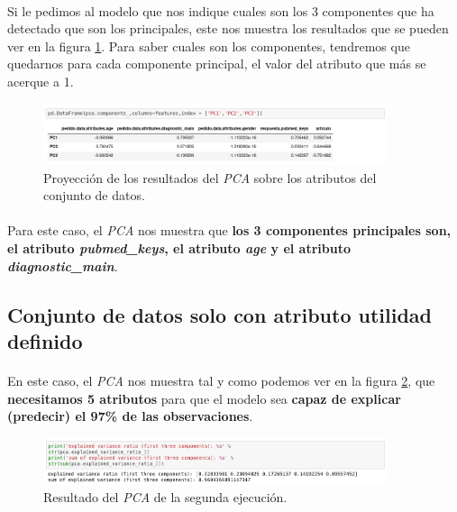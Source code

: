 \paragraph{}
Si le pedimos al modelo que nos indique cuales son los 3 componentes que ha detectado que son los principales, este nos muestra los resultados que se pueden ver en la figura \ref{pcaOneAtributos}. Para saber cuales son los componentes, tendremos que quedarnos para cada componente principal, el valor del atributo que más se acerque a 1.

\begin{figure}[!htb]
  \centering
    \includegraphics[width=0.9\textwidth]{images/resultados_procesado_de_datos_pca1_atributos.png}
    \caption{Proyección de los resultados del \textit{PCA} sobre los atributos del conjunto de datos.}
  \label{pcaOneAtributos}
\end{figure}

\paragraph{}
Para este caso, el \textit{PCA} nos muestra que \textbf{los 3 componentes principales son, el atributo \textit{pubmed\_keys}, el atributo \textit{age} y el atributo \textit{diagnostic\_main}}.

\subsection{Conjunto de datos solo con atributo utilidad definido}

\paragraph{}
En este caso, el \textit{PCA} nos muestra tal y como podemos ver en la figura \ref{pcaTwoResult}, que \textbf{necesitamos 5 atributos} para que el modelo sea \textbf{capaz de explicar (predecir) el 97\% de las observaciones}.

\begin{figure}[!htb]
  \centering
    \includegraphics[width=0.9\textwidth]{images/resultados_procesado_de_datos_pca2_result.png}
    \caption{Resultado del \textit{PCA} de la segunda ejecución.}
  \label{pcaTwoResult}
\end{figure}

